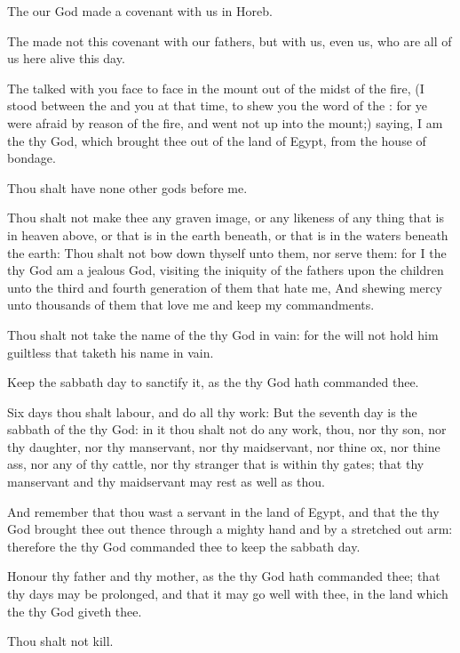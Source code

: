 \verse The \LORD our God made a covenant with us in Horeb.

\verse The \LORD made not this covenant with our fathers, but with us, even us, who are all of us here alive this day.

\verse The \LORD talked with you face to face in the mount out of the midst of the fire, \verse (I stood between the \LORD and you at that time, to shew you the word of the \LORD: for ye were afraid by reason of the fire, and went not up into the mount;) saying, \verse I am the \LORD thy God, which brought thee out of the land of Egypt, from the house of bondage.

\verse Thou shalt have none other gods before me.

\verse Thou shalt not make thee any graven image, or any likeness of any thing that is in heaven above, or that is in the earth beneath, or that is in the waters beneath the earth: \verse Thou shalt not bow down thyself unto them, nor serve them: for I the \LORD thy God am a jealous God, visiting the iniquity of the fathers upon the children unto the third and fourth generation of them that hate me, \verse And shewing mercy unto thousands of them that love me and keep my commandments.

\verse Thou shalt not take the name of the \LORD thy God in vain: for the \LORD will not hold him guiltless that taketh his name in vain.

\verse Keep the sabbath day to sanctify it, as the \LORD thy God hath commanded thee.

\verse Six days thou shalt labour, and do all thy work: \verse But the seventh day is the sabbath of the \LORD thy God: in it thou shalt not do any work, thou, nor thy son, nor thy daughter, nor thy manservant, nor thy maidservant, nor thine ox, nor thine ass, nor any of thy cattle, nor thy stranger that is within thy gates; that thy manservant and thy maidservant may rest as well as thou.

\verse And remember that thou wast a servant in the land of Egypt, and that the \LORD thy God brought thee out thence through a mighty hand and by a stretched out arm: therefore the \LORD thy God commanded thee to keep the sabbath day.

\verse Honour thy father and thy mother, as the \LORD thy God hath commanded thee; that thy days may be prolonged, and that it may go well with thee, in the land which the \LORD thy God giveth thee.

\verse Thou shalt not kill.

